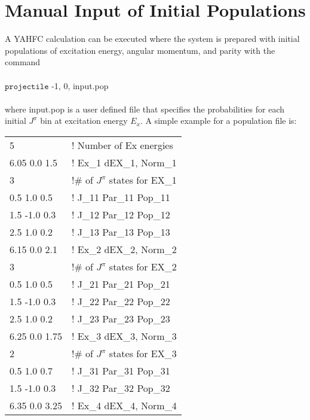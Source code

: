 \documentclass[
10pt,
showpacs,preprintnumbers,footinbib,
amsfonts,amsmath,amssymb,
aps,
prc,twocolumn,groupedaddress,superscriptaddress,
showkeys,
nofootinbib
]{revtex4-1}
\begin{document}
\appendix
\section{Manual Input of Initial Populations}
\label{App:Populations}
A YAHFC calculation can be executed where the system is prepared with initial populations of excitation energy, angular momentum, and parity with the command \\
\\
${\texttt{projectile}}$ -1, 0, input.pop\\
\\
where input.pop is a user defined file that specifies the probabilities for each initial $J^\pi$ bin at excitation energy $E_x$. A simple example for a population file is:
\begin{center}
\begin{tabular}{| p{3 cm} p{5 cm}|}
\hline
   5                     &                 !   Number of Ex energies\\
  6.05  0.0  1.5         &               ! Ex\_1  dEX\_1, Norm\_1 \\
   3                      &               !\# of $J^\pi$ states for EX\_1\\
  0.5  1.0  0.5      &               ! J\_11  Par\_11 Pop\_11\\
  1.5  -1.0  0.3      &               ! J\_12  Par\_12 Pop\_12\\
  2.5  1.0  0.2      &               ! J\_13  Par\_13 Pop\_13\\
  6.15  0.0  2.1         &               ! Ex\_2  dEX\_2, Norm\_2 \\
   3                     &               !\# of $J^\pi$ states for EX\_2\\
  0.5  1.0  0.5      &               ! J\_21  Par\_21 Pop\_21\\
  1.5  -1.0  0.3      &               ! J\_22  Par\_22 Pop\_22\\
  2.5  1.0  0.2      &               ! J\_23  Par\_23 Pop\_23\\
  6.25  0.0  1.75          &               ! Ex\_3  dEX\_3, Norm\_3 \\
   2                     &               !\# of $J^\pi$ states for EX\_3\\
  0.5  1.0  0.7      &               ! J\_31  Par\_31 Pop\_31\\
  1.5  -1.0  0.3      &               ! J\_32  Par\_32 Pop\_32\\
  6.35  0.0  3.25        &               ! Ex\_4  dEX\_4, Norm\_4 \\

\end{tabular}
\end{center}
\end{document}
